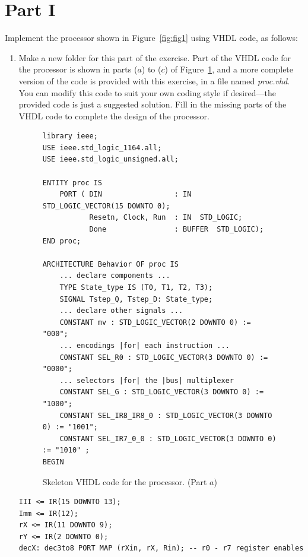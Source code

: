 \documentclass[epsfig,10pt,fullpage]{article} \addtolength{\textwidth}{1.5in}
\begin{document}
\section*{Part I}
Implement the processor shown in Figure~\ref{fig:fig1} using VHDL code, as follows:
\begin{enumerate}
\item Make a new folder for this part of the exercise. 
Part of the VHDL code for the processor is shown in parts ($a$) to ($c$) of 
Figure~\ref{fig:fig2}, and a more complete version of the code is provided with this exercise,
in a file named {\it proc.vhd}. You can modify this code to suit your own coding style
if desired---the provided code is just a suggested solution. Fill in the missing parts of
the VHDL code to complete the design of the processor.

\lstset{language=VHDL,numbers=none,escapechar=|}
\begin{figure}[h]
\begin{center}
\begin{minipage}[t]{15 cm}
\begin{lstlisting}[name=proc]
library ieee;
USE ieee.std_logic_1164.all;
USE ieee.std_logic_unsigned.all;

ENTITY proc IS
    PORT ( DIN                 : IN  STD_LOGIC_VECTOR(15 DOWNTO 0);
           Resetn, Clock, Run  : IN  STD_LOGIC;
           Done                : BUFFER  STD_LOGIC);
END proc;
   
ARCHITECTURE Behavior OF proc IS
    ... declare components ...
    TYPE State_type IS (T0, T1, T2, T3);
    SIGNAL Tstep_Q, Tstep_D: State_type;
    ... declare other signals ...
    CONSTANT mv : STD_LOGIC_VECTOR(2 DOWNTO 0) := "000";
    ... encodings |for| each instruction ...
    CONSTANT SEL_R0 : STD_LOGIC_VECTOR(3 DOWNTO 0) := "0000";
    ... selectors |for| the |bus| multiplexer
    CONSTANT SEL_G : STD_LOGIC_VECTOR(3 DOWNTO 0) := "1000";
    CONSTANT SEL_IR8_IR8_0 : STD_LOGIC_VECTOR(3 DOWNTO 0) := "1001"; 
    CONSTANT SEL_IR7_0_0 : STD_LOGIC_VECTOR(3 DOWNTO 0) := "1010" ; 
BEGIN
\end{lstlisting}
\end{minipage}
\caption{Skeleton VHDL code for the processor. (Part $a$)}
\label{fig:fig2}
\end{center}
\end{figure}

\begin{center}
\begin{minipage}[t]{15 cm}
\begin{lstlisting}[name=proc]
III <= IR(15 DOWNTO 13);
Imm <= IR(12);
rX <= IR(11 DOWNTO 9);
rY <= IR(2 DOWNTO 0);
decX: dec3to8 PORT MAP (rXin, rX, Rin); -- r0 - r7 register enables


\end{lstlisting}
\end{minipage}
\end{center}
\end{enumerate}
\end{document}
